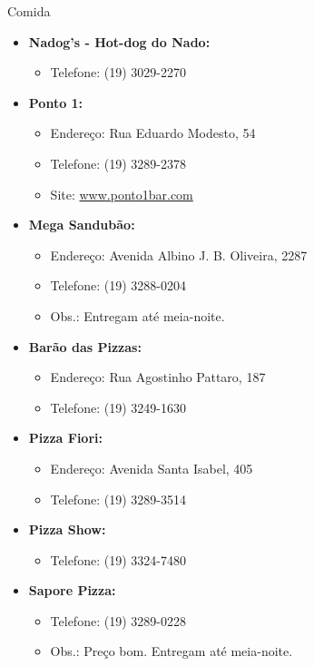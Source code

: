 \begin{story}{Comida}
\begin{itemize}
\item \textbf{Nadog's - Hot-dog do Nado:}
\begin{itemize}
\item Telefone: (19) 3029-2270
\end{itemize}

\item \textbf{Ponto 1:}
\begin{itemize}
\item Endereço: Rua Eduardo Modesto, 54
\item Telefone: (19) 3289-2378
\item Site: \url{www.ponto1bar.com}
\end{itemize}

\item \textbf{Mega Sandubão:}
\begin{itemize}
\item Endereço: Avenida Albino J. B. Oliveira, 2287
\item Telefone: (19) 3288-0204
\item Obs.: Entregam até meia-noite.
\end{itemize}

\item \textbf{Barão das Pizzas:}
\begin{itemize}
\item Endereço: Rua Agostinho Pattaro, 187
\item Telefone: (19) 3249-1630
\end{itemize}

\item \textbf{Pizza Fiori:}
\begin{itemize}
\item Endereço: Avenida Santa Isabel, 405
\item Telefone: (19) 3289-3514
\end{itemize}

\item \textbf{Pizza Show:}
\begin{itemize}
\item Telefone: (19) 3324-7480
\end{itemize}

\item \textbf{Sapore Pizza:}
\begin{itemize}
\item Telefone: (19) 3289-0228
\item Obs.: Preço bom. Entregam até meia-noite. 
\end{itemize}


\end{itemize}
\end{story}
